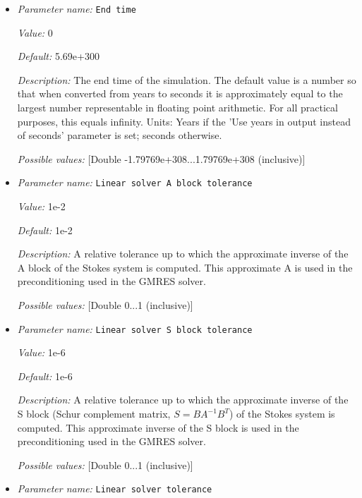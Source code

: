 \begin{itemize}
{\it Possible values:} [Integer range 2...4 (inclusive)]
\item {\it Parameter name:} {\tt End time}
\label{parameters:End time}


{\it Value:} 0


{\it Default:} 5.69e+300


{\it Description:} The end time of the simulation. The default value is a number so that when converted from years to seconds it is approximately equal to the largest number representable in floating point arithmetic. For all practical purposes, this equals infinity. Units: Years if the 'Use years in output instead of seconds' parameter is set; seconds otherwise.


{\it Possible values:} [Double -1.79769e+308...1.79769e+308 (inclusive)]
\item {\it Parameter name:} {\tt Linear solver A block tolerance}
\label{parameters:Linear solver A block tolerance}


{\it Value:} 1e-2


{\it Default:} 1e-2


{\it Description:} A relative tolerance up to which the approximate inverse of the A block of the Stokes system is computed. This approximate A is used in the preconditioning used in the GMRES solver.


{\it Possible values:} [Double 0...1 (inclusive)]
\item {\it Parameter name:} {\tt Linear solver S block tolerance}
\label{parameters:Linear solver S block tolerance}


{\it Value:} 1e-6


{\it Default:} 1e-6


{\it Description:} A relative tolerance up to which the approximate inverse of the S block (Schur complement matrix, $S = BA^{-1}B^{T}$) of the Stokes system is computed. This approximate inverse of the S block is used in the preconditioning used in the GMRES solver.


{\it Possible values:} [Double 0...1 (inclusive)]
\item {\it Parameter name:} {\tt Linear solver tolerance}
\label{parameters:Linear solver tolerance}



\end{itemize}
